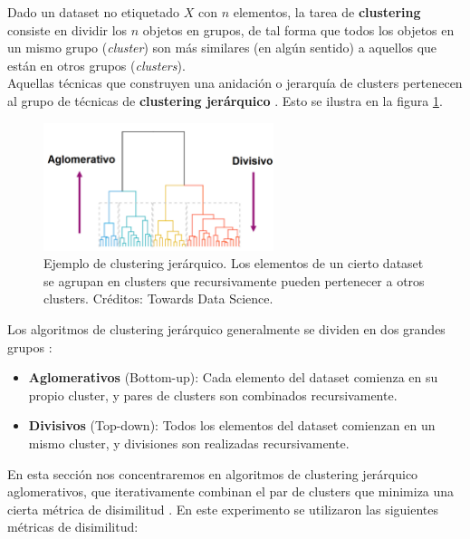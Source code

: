 Dado un dataset no etiquetado $X$ con $n$ elementos, la tarea de \textbf{clustering} \cite{Jain88} consiste en dividir los $n$ objetos en grupos, de tal forma que todos los objetos en un mismo grupo (\textit{cluster}) son más similares (en algún sentido) a aquellos que están en otros grupos (\textit{clusters}). \\

Aquellas técnicas que construyen una anidación o jerarquía de clusters pertenecen al grupo de técnicas de \textbf{clustering jerárquico} \cite{Jain88} \cite{clustering}. Esto se ilustra en la figura \ref{fig:jerarquico}. \\

\begin{figure}[h!]
\begin{center}
 \includegraphics[width=0.6\textwidth]{Kap5/jerarquico.png}
\end{center}

\caption{Ejemplo de clustering jerárquico. Los elementos de un cierto dataset se agrupan en clusters que recursivamente pueden pertenecer a otros clusters. Créditos: Towards Data Science.}
\label{fig:jerarquico}
\end{figure}

Los algoritmos de clustering jerárquico generalmente se dividen en dos grandes grupos \cite{clustering} \cite{iretrieval} :

\begin{itemize}
\item \textbf{Aglomerativos} (Bottom-up): Cada elemento del dataset comienza en su propio cluster, y pares de clusters son combinados recursivamente.
\item \textbf{Divisivos} (Top-down):  Todos los elementos del dataset comienzan en un mismo cluster, y divisiones son realizadas recursivamente.
\end{itemize}

En esta sección nos concentraremos en algoritmos de clustering jerárquico aglomerativos, que iterativamente combinan el par de clusters que minimiza una cierta métrica de disimilitud \cite{clustering}. En este experimento se utilizaron las siguientes métricas de disimilitud:

